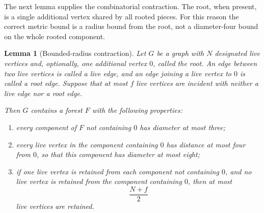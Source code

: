 \documentclass[10pt]{article}
\newtheorem{lemma}[theorem]{Lemma}
\theoremstyle{definition}
\begin{document}
The next lemma supplies the combinatorial contraction.  The root, when
present, is a single additional vertex shared by all rooted pieces.  For
this reason the correct metric bound is a radius bound from the root, not a
diameter-four bound on the whole rooted component.

\begin{lemma}[Bounded-radius contraction]
Let $G$ be a graph with $N$ designated live vertices and, optionally, one
additional vertex $0$, called the root.  An edge between two live vertices
is called a live edge, and an edge joining a live vertex to $0$ is called a
root edge.  Suppose that at most $f$ live vertices are incident with neither
a live edge nor a root edge.

Then $G$ contains a forest $F$ with the following properties:
\begin{enumerate}
    \item every component of $F$ not containing $0$ has diameter at most
          three;
    \item every live vertex in the component containing $0$ has distance at
          most four from $0$, so that this component has diameter at most
          eight;
    \item if one live vertex is retained from each component not containing
          $0$, and no live vertex is retained from the component containing
          $0$, then at most
          \[
              \frac{N+f}{2}
          \]
          live vertices are retained.
\end{enumerate}
\end{lemma}
\end{document}
